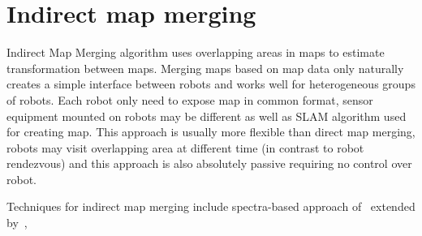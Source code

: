 \section{Indirect map merging}

Indirect Map Merging algorithm uses overlapping areas in maps to estimate transformation between maps. Merging maps based on map data only naturally creates a simple interface between robots and works well for heterogeneous groups of robots. Each robot only need to expose map in common format, sensor equipment mounted on robots may be different as well as \gls{SLAM} algorithm used for creating map. This approach is usually more flexible than direct map merging, robots may visit overlapping area at different time (in contrast to robot rendezvous) and this approach is also absolutely passive requiring no control over robot.

Techniques for indirect map merging include spectra-based approach of~\cite{Carpin2008} extended by~\cite{Lee2011}, \cite{Wang2012}
